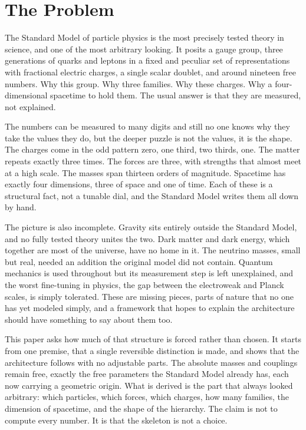\section{The Problem}

The Standard Model of particle physics is the most precisely tested theory in science, and one of the most arbitrary
looking. It posits a gauge group, three generations of quarks and leptons in a fixed and peculiar set of
representations with fractional electric charges, a single scalar doublet, and around nineteen free numbers. Why this
group. Why three families. Why these charges. Why a four-dimensional spacetime to hold them. The usual answer is that
they are measured, not explained.

The numbers can be measured to many digits and still no one knows why they take the values they do, but the deeper
puzzle is not the values, it is the shape. The charges come in the odd pattern zero, one third, two thirds, one. The
matter repeats exactly three times. The forces are three, with strengths that almost meet at a high scale. The masses
span thirteen orders of magnitude. Spacetime has exactly four dimensions, three of space and one of time. Each of these
is a structural fact, not a tunable dial, and the Standard Model writes them all down by hand.

The picture is also incomplete. Gravity sits entirely outside the Standard Model, and no fully tested theory unites the
two. Dark matter and dark energy, which together are most of the universe, have no home in it. The neutrino masses,
small but real, needed an addition the original model did not contain. Quantum mechanics is used throughout but its
measurement step is left unexplained, and the worst fine-tuning in physics, the gap between the electroweak and Planck
scales, is simply tolerated. These are missing pieces, parts of nature that no one has yet modeled simply, and a
framework that hopes to explain the architecture should have something to say about them too.

This paper asks how much of that structure is forced rather than chosen. It starts from one premise, that a single
reversible distinction is made, and shows that the architecture follows with no adjustable parts. The absolute masses
and couplings remain free, exactly the free parameters the Standard Model already has, each now carrying a geometric
origin. What is derived is the part that always looked arbitrary: which particles, which forces, which charges, how
many families, the dimension of spacetime, and the shape of the hierarchy. The claim is not to compute every number. It
is that the skeleton is not a choice.
